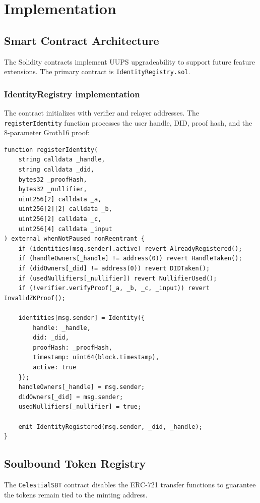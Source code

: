 \documentclass[12pt,a4paper,oneside]{report}
\begin{document}
\newpage

\chapter{Implementation}

\section{Smart Contract Architecture}
The Solidity contracts implement UUPS upgradeability to support future feature extensions. The primary contract is \texttt{IdentityRegistry.sol}.

\subsection{IdentityRegistry implementation}
The contract initializes with verifier and relayer addresses. The \texttt{registerIdentity} function processes the user handle, DID, proof hash, and the 8-parameter Groth16 proof:

\begin{lstlisting}[language=Solidity, caption=IdentityRegistry Registration Logic]
function registerIdentity(
    string calldata _handle,
    string calldata _did,
    bytes32 _proofHash,
    bytes32 _nullifier,
    uint256[2] calldata _a,
    uint256[2][2] calldata _b,
    uint256[2] calldata _c,
    uint256[4] calldata _input
) external whenNotPaused nonReentrant {
    if (identities[msg.sender].active) revert AlreadyRegistered();
    if (handleOwners[_handle] != address(0)) revert HandleTaken();
    if (didOwners[_did] != address(0)) revert DIDTaken();
    if (usedNullifiers[_nullifier]) revert NullifierUsed();
    if (!verifier.verifyProof(_a, _b, _c, _input)) revert InvalidZKProof();

    identities[msg.sender] = Identity({
        handle: _handle,
        did: _did,
        proofHash: _proofHash,
        timestamp: uint64(block.timestamp),
        active: true
    });
    handleOwners[_handle] = msg.sender;
    didOwners[_did] = msg.sender;
    usedNullifiers[_nullifier] = true;
    
    emit IdentityRegistered(msg.sender, _did, _handle);
}
\end{lstlisting}

\section{Soulbound Token Registry}
The \texttt{CelestialSBT} contract disables the ERC-721 transfer functions to guarantee the tokens remain tied to the minting address.
\end{document}

